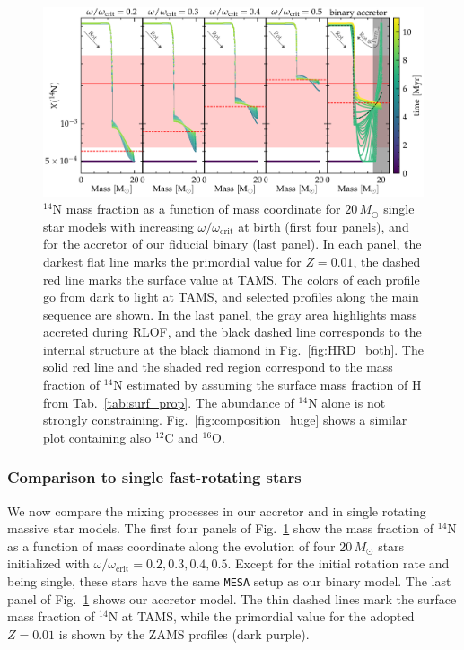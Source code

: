 \documentclass[twocolumn,twocolappendix,trackchanges]{aastex63}
\DeclareRobustCommand{\Figref}[1]{Fig.~\ref{#1}}
\DeclareRobustCommand{\Tabref}[1]{Tab.~\ref{#1}}
\begin{document}
\begin{figure}[htbp]
  \centering
  \includegraphics[width=\textwidth]{n14_struct_complete_zeta_ab}
  \caption{$^{14}\mathrm{N}$ mass fraction as a function of mass
    coordinate for $20\,M_\odot$ single star models with increasing
    $\omega/\omega_\mathrm{crit}$ at birth (first four panels), and
    for the accretor of our fiducial binary (last panel). In each
    panel, the darkest flat line marks the primordial value for
    $Z=0.01$, the dashed red line marks the surface value at TAMS. The
    colors of each profile go from dark to light at TAMS, and selected
    profiles along the main sequence are shown.  In
    the last panel, the gray area highlights mass accreted during
    RLOF, and the black dashed line corresponds to the internal
    structure at the black
    diamond in \Figref{fig:HRD_both}. The solid red line and
    the shaded red region correspond to the mass fraction of
    $^{14}\mathrm{N}$ estimated by  assuming
    the surface mass fraction of H from \Tabref{tab:surf_prop}. The
    abundance of $^{14}\mathrm{N}$ alone is not strongly
    constraining. \Figref{fig:composition_huge} shows a similar plot
    containing also $^{12}\mathrm{C}$ and $^{16}\mathrm{O}$.}
  \label{fig:n14}
\end{figure}

\subsubsection{Comparison to single fast-rotating stars}
\label{sec:mix_comparison_single}

We now compare the mixing processes
in our accretor and in single rotating massive star models. The first
four panels of \Figref{fig:n14} show the mass fraction of $^{14}\mathrm{N}$
as a function of mass coordinate along the evolution of four
$20\,M_\odot$ stars initialized with
$\omega/\omega_\mathrm{crit}=0.2,0.3,0.4,0.5$. Except for the initial rotation rate and
being single, these stars have the same \texttt{MESA}
setup as our binary model. The last panel of \Figref{fig:n14} shows
our accretor model. The thin
dashed lines mark the surface mass
fraction of $^{14}\mathrm{N}$ at TAMS, while the primordial value for
the adopted $Z=0.01$ is shown by the ZAMS profiles (dark purple).
\end{document}
